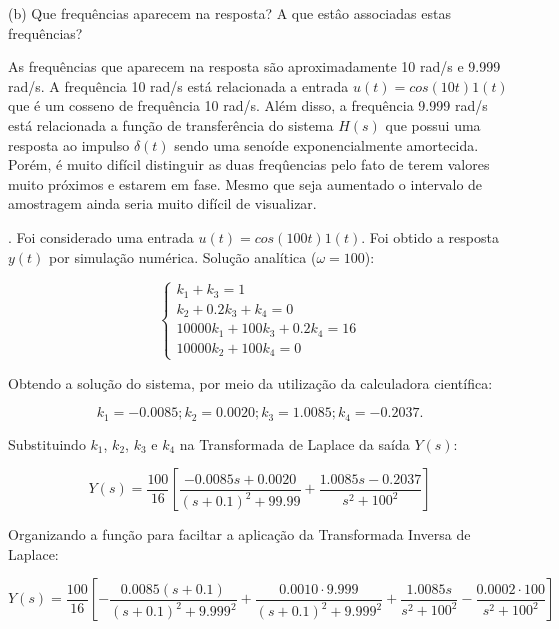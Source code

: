 \documentclass[10pt]{article}
\begin{document}
(b) Que frequências aparecem na resposta? A que estâo associadas estas frequências?

\quad As frequências que aparecem na resposta são aproximadamente 10 rad/s e 9.999 rad/s.
A frequência 10 rad/s está relacionada a entrada $u(t) = cos(10t) 1(t)$ que é um cosseno de frequência 10 rad/s.
Além disso, a frequência 9.999 rad/s está relacionada a função de transferência do sistema $H(s)$
que possui uma resposta ao impulso $\delta(t)$ sendo uma senoíde exponencialmente amortecida.
Porém, é muito difícil distinguir as duas freqûencias pelo fato de terem valores muito próximos e
estarem em fase. Mesmo que seja aumentado o intervalo de amostragem ainda seria muito difícil de visualizar.

\newpage

. Foi considerado uma entrada $u(t) = cos(100 t) 1(t)$. Foi obtido a resposta $y(t)$ por simulação numérica. Solução analítica ($\omega = 100$):

\begin{equation}
    \left\{
    \begin{array}{l}
        k_1 + k_3 = 1 \\
        k_2 + 0.2k_3 +k_4 = 0 \\
        10000k_1 + 100k_3 + 0.2k_4 = 16 \\
        10000k_2 + 100k_4 = 0
    \end{array}
    \right. 
\end{equation}

\quad Obtendo a solução do sistema, por meio da utilização da calculadora científica:

\begin{equation}
    k_1 = -0.0085; k_2 = 0.0020; k_3 = 1.0085; k_4 = -0.2037.
\end{equation}

\quad Substituindo $k_1$, $k_2$, $k_3$ e $k_4$ na Transformada de Laplace da saída $Y(s)$:

\begin{equation}
    Y(s) = \frac{100}{16} \left[ \frac{-0.0085s+0.0020}{(s + 0.1)^2 + 99.99} + \frac{1.0085s -0.2037}{s^2 + 100^2} \right]
\end{equation}

\quad Organizando a função para faciltar a aplicação da Transformada Inversa de Laplace:

\begin{equation}
    Y(s) = \frac{100}{16} \left[-\frac{0.0085(s + 0.1)}{(s + 0.1)^2 + 9.999^2} + \frac{0.0010 \cdot 9.999}{(s + 0.1)^2 + 9.999^2} + \frac{1.0085s}{s^2 + 100^2} - \frac{0.0002 \cdot 100}{s^2 + 100^2} \right]
\end{equation}
\end{document}
